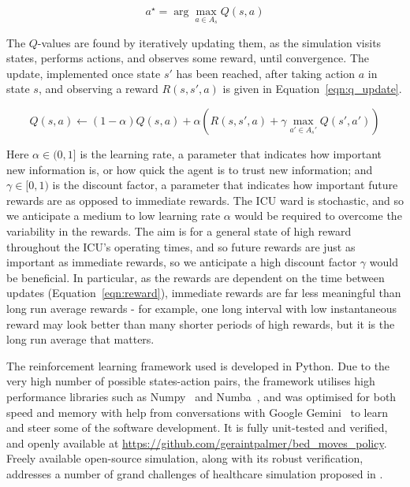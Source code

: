 \documentclass{article}
\begin{document}
 \begin{equation}\label{eqn:optimal_policy}
 a^{\star} = \arg\!\max_{a \in A_s} Q(s, a)
 \end{equation}

The $Q$-values are found by iteratively updating them, as the simulation visits
states, performs actions, and observes some reward, until convergence.
The update, implemented once state $s'$ has been reached, after taking action
$a$ in state $s$, and observing a reward $R(s, s', a)$ is given in
Equation~\ref{eqn:q_update}.

\begin{equation}\label{eqn:q_update}
Q(s, a) \leftarrow (1 - \alpha) Q(s, a) + \alpha \left(R(s, s', a) + \gamma \max_{a' \in A_s'} Q(s', a') \right)
\end{equation}

Here $\alpha \in (0, 1]$ is the learning rate, a parameter that indicates how
important new information is, or how quick the agent is to trust new
information; and $\gamma \in [0, 1)$ is the discount factor, a parameter that
indicates how important future rewards are as opposed to immediate rewards.
The ICU ward is stochastic, and so we anticipate a medium to low learning rate
$\alpha$ would be required to overcome the variability in the rewards.
The aim is for a general state of high reward throughout the ICU's operating
times, and so future rewards are just as important as immediate rewards, so we
anticipate a high discount factor $\gamma$ would be beneficial.
In particular, as the rewards are dependent on the time between updates
(Equation~\ref{eqn:reward}), immediate rewards are far less meaningful than long
run average rewards - for example, one long interval with low instantaneous
reward may look better than many shorter periods of high rewards, but it is the
long run average that matters.

The reinforcement learning framework used is developed in Python.
Due to the very high number of possible states-action pairs, the framework
utilises high performance libraries such as Numpy~\cite{numpy20} and
Numba~\cite{numba15}, and was optimised for both speed and memory with help from
conversations with Google Gemini~\cite{googlegemini26} to learn and steer some
of the software development.
It is fully unit-tested and verified, and openly available
at \url{https://github.com/geraintpalmer/bed_moves_policy}.
Freely available open-source simulation, along with its robust verification,
addresses a number of grand challenges of healthcare simulation proposed in
\cite{boyle26}.
\end{document}

